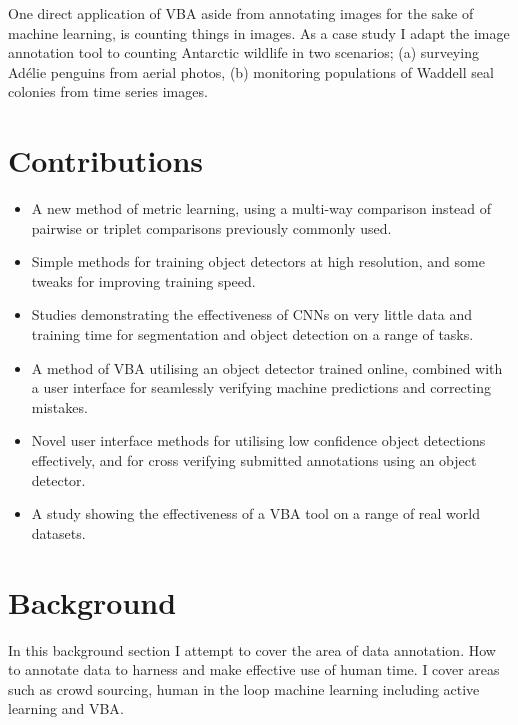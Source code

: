 One direct application of \gls{VBA} aside from annotating images for the sake of machine learning, is counting things in images. As a case study I adapt the image annotation tool to counting Antarctic wildlife in two scenarios; (a) surveying Ad\'elie penguins from aerial photos, (b) monitoring populations of Waddell seal colonies from time series images.

\section {Contributions}

\begin{itemize}
    \item A new method of metric learning, using a multi-way comparison instead of pairwise or triplet comparisons previously commonly used.
    
    \item Simple methods for training object detectors at high resolution, and some tweaks for improving training speed.
    
    \item Studies demonstrating the effectiveness of \gls{CNN}s on very little data and training time for segmentation and object detection on a range of tasks.
    
    \item A method of \gls{VBA} utilising an object detector trained online, combined with a user interface for seamlessly verifying machine predictions and correcting mistakes.

    \item Novel user interface methods for utilising low confidence object detections effectively, and for cross verifying submitted annotations using an object detector.
    
    \item A study showing the effectiveness of a \gls{VBA} tool on a range of  real world datasets.
    
    
    
    
\end{itemize}

\section {Background}

In this background section I attempt to cover the area of data annotation. How to annotate data to harness and make effective use of human time. I cover areas such as crowd sourcing, human in the loop machine learning including active learning and \gls{VBA}.

